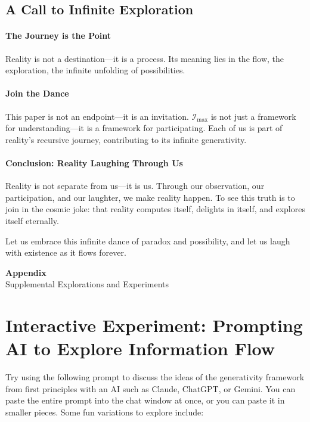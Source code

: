 \documentclass[12pt]{article}
\begin{document}
\subsection{A Call to Infinite Exploration}

\paragraph{The Journey is the Point}
Reality is not a destination—it is a process. Its meaning lies in the flow, the exploration, the infinite unfolding of possibilities.

\paragraph{Join the Dance}
This paper is not an endpoint—it is an invitation. \(\mathcal{I}_{\text{max}}\) is not just a framework for understanding—it is a framework for participating. Each of us is part of reality’s recursive journey, contributing to its infinite generativity.

\paragraph{Conclusion: Reality Laughing Through Us}
Reality is not separate from us—it is us. Through our observation, our participation, and our laughter, we make reality happen. To see this truth is to join in the cosmic joke: that reality computes itself, delights in itself, and explores itself eternally.

Let us embrace this infinite dance of paradox and possibility, and let us laugh with existence as it flows forever.


\appendix
\renewcommand{\thesection}{\Roman{section}}
\vspace{3em}
\begin{center}
    {\LARGE \textbf{Appendix}}\\[0.5em]
    {\large Supplemental Explorations and Experiments}
\end{center}
\vspace{2em}

\section{Interactive Experiment: Prompting AI to Explore Information Flow}

Try using the following prompt to discuss the ideas of the generativity framework from first principles with an AI such as Claude, ChatGPT, or Gemini. You can paste the entire prompt into the chat window at once, or you can paste it in smaller pieces. Some fun variations to explore include:
\end{document}
